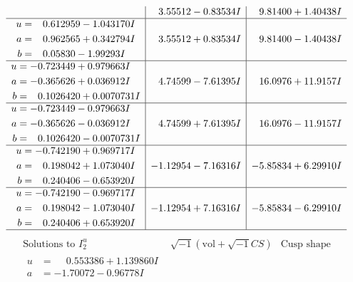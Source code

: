 \documentclass[1p]{elsarticle_modified}
\theoremstyle{definition}
\newcommand{\I}{\sqrt{-1}}
\begin{document}
$$\begin{array}{c|c|c}
 & \phantom{-}3.55512 - 0.83534 I & \phantom{-}9.81400 + 1.40438 I \\ \hline\begin{aligned}
u &= \phantom{-}0.612959 - 1.043170 I \\
a &= \phantom{-}0.962565 + 0.342794 I \\
b &= \phantom{-}0.05830 - 1.99293 I\end{aligned}
 & \phantom{-}3.55512 + 0.83534 I & \phantom{-}9.81400 - 1.40438 I \\ \hline\begin{aligned}
u &= -0.723449 + 0.979663 I \\
a &= -0.365626 + 0.036912 I \\
b &= \phantom{-}0.1026420 + 0.0070731 I\end{aligned}
 & \phantom{-}4.74599 - 7.61395 I & \phantom{-}16.0976 + 11.9157 I \\ \hline\begin{aligned}
u &= -0.723449 - 0.979663 I \\
a &= -0.365626 - 0.036912 I \\
b &= \phantom{-}0.1026420 - 0.0070731 I\end{aligned}
 & \phantom{-}4.74599 + 7.61395 I & \phantom{-}16.0976 - 11.9157 I \\ \hline\begin{aligned}
u &= -0.742190 + 0.969717 I \\
a &= \phantom{-}0.198042 + 1.073040 I \\
b &= \phantom{-}0.240406 - 0.653920 I\end{aligned}
 & -1.12954 - 7.16316 I & -5.85834 + 6.29910 I \\ \hline\begin{aligned}
u &= -0.742190 - 0.969717 I \\
a &= \phantom{-}0.198042 - 1.073040 I \\
b &= \phantom{-}0.240406 + 0.653920 I\end{aligned}
 & -1.12954 + 7.16316 I & -5.85834 - 6.29910 I\\
 \hline 
 \end{array}$$\newpage$$\begin{array}{c|c|c}  
\text{Solutions to }I^u_{2}& \I (\text{vol} + \sqrt{-1}CS) & \text{Cusp shape}\\
 \hline 
\begin{aligned}
u &= \phantom{-}0.553386 + 1.139860 I \\
a &= -1.70072 - 0.96778 I \\

\end{aligned}
\end{array}$$
\end{document}
